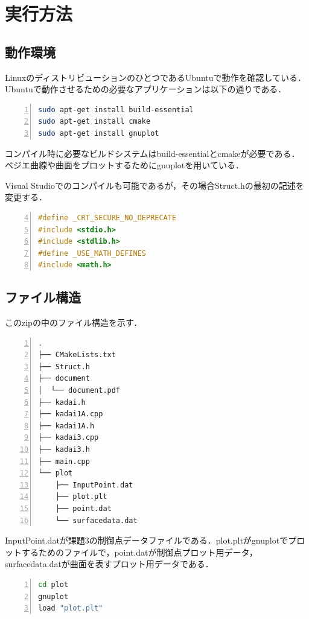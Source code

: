 \documentclass[a4paper,10pt]{jsarticle}
\begin{document}
\section{実行方法}
\subsection{動作環境}
LinuxのディストリビューションのひとつであるUbuntuで動作を確認している．
Ubuntuで動作させるための必要なアプリケーションは以下の通りである．

\begin{lstlisting}[basicstyle=\ttfamily\footnotesize, language=Bash, frame=single, firstnumber=1, numbers=left, breaklines=true]
sudo apt-get install build-essential
sudo apt-get install cmake
sudo apt-get install gnuplot
\end{lstlisting}

コンパイル時に必要なビルドシステムはbuild-essentialとcmakeが必要である．
ベジエ曲線や曲面をプロットするためにgnuplotを用いている．

Visual Studioでのコンパイルも可能であるが，その場合Struct.hの最初の記述を変更する．

\begin{lstlisting}[basicstyle=\ttfamily\footnotesize, language=C, frame=single, firstnumber=4, numbers=left, breaklines=true]
#define _CRT_SECURE_NO_DEPRECATE
#include <stdio.h>
#include <stdlib.h>
#define _USE_MATH_DEFINES
#include <math.h>
\end{lstlisting}

\subsection{ファイル構造}
このzipの中のファイル構造を示す．

\begin{lstlisting}[basicstyle=\ttfamily\footnotesize, language=Bash, frame=single, firstnumber=1, numbers=left, breaklines=true]
.
├── CMakeLists.txt
├── Struct.h
├── document
│  └── document.pdf
├── kadai.h
├── kadai1A.cpp
├── kadai1A.h
├── kadai3.cpp
├── kadai3.h
├── main.cpp
└── plot
    ├── InputPoint.dat
    ├── plot.plt
    ├── point.dat
    └── surfacedata.dat
\end{lstlisting}
InputPoint.datが課題3の制御点データファイルである．plot.pltがgnuplotでプロットするためのファイルで，point.datが制御点プロット用データ，surfacedata.datが曲面を表すプロット用データである．

\begin{lstlisting}[basicstyle=\ttfamily\footnotesize, language=Bash, frame=single, firstnumber=1, numbers=left, breaklines=true]
cd plot
gnuplot
load "plot.plt"
\end{lstlisting}
\end{document}
